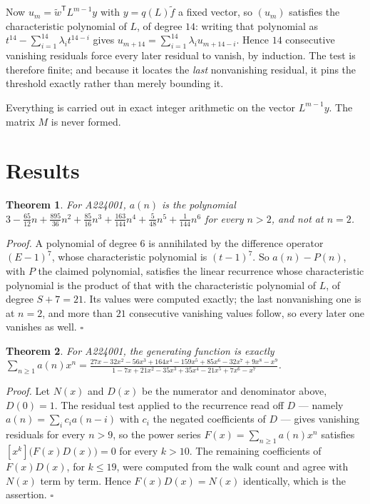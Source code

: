 \documentclass[11pt]{article}
\newtheorem{theorem}{Theorem}
\theoremstyle{definition}
\begin{document}
Now $u_m = \tilde w^{\mathsf T} L^{m-1} y$ with $y = q(L)\tilde f$ a fixed vector, so $(u_m)$ satisfies the characteristic polynomial of $L$, of degree $14$: writing that polynomial as $t^{14} - \sum_{i=1}^{14} \lambda_i t^{14-i}$ gives $u_{m+14} = \sum_{i=1}^{14} \lambda_i u_{m+14-i}$. Hence $14$ consecutive vanishing residuals force every later residual to vanish, by induction. The test is therefore finite; and because it locates the {\itshape last} nonvanishing residual, it pins the threshold exactly rather than merely bounding it.

Everything is carried out in exact integer arithmetic on the vector $L^{m-1}y$. The matrix $M$ is never formed.

\section{Results}

\begin{theorem} For A224001, $a(n)$ is the polynomial $3 - \frac{65}{12}n + \frac{895}{36}n^{2} + \frac{85}{16}n^{3} + \frac{163}{144}n^{4} + \frac{5}{48}n^{5} + \frac{1}{144}n^{6}$ for every $n > 2$, and not at $n = 2$.\end{theorem}

{\itshape Proof.} A polynomial of degree $6$ is annihilated by the difference operator $(E-1)^{7}$, whose characteristic polynomial is $(t-1)^{7}$. So $a(n) - P(n)$, with $P$ the claimed polynomial, satisfies the linear recurrence whose characteristic polynomial is the product of that with the characteristic polynomial of $L$, of degree $S + 7 = 21$. Its values were computed exactly; the last nonvanishing one is at $n = 2$, and more than $21$ consecutive vanishing values follow, so every later one vanishes as well. $\square$

\begin{theorem} For A224001, the generating function is exactly $\sum_{n\ge 1} a(n)x^n = \frac{27x - 32x^{2} - 56x^{3} + 164x^{4} - 159x^{5} + 85x^{6} - 32x^{7} + 9x^{8} - x^{9}}{1 - 7x + 21x^{2} - 35x^{3} + 35x^{4} - 21x^{5} + 7x^{6} - x^{7}}$.\end{theorem}

{\itshape Proof.} Let $N(x)$ and $D(x)$ be the numerator and denominator above, $D(0)=1$. The residual test applied to the recurrence read off $D$ --- namely $a(n) = \sum_i c_i a(n-i)$ with $c_i$ the negated coefficients of $D$ --- gives vanishing residuals for every $n > 9$, so the power series $F(x)=\sum_{n\ge 1}a(n)x^n$ satisfies $[x^k]\bigl(F(x)D(x)\bigr) = 0$ for every $k > 10$. The remaining coefficients of $F(x)D(x)$, for $k \le 19$, were computed from the walk count and agree with $N(x)$ term by term. Hence $F(x)D(x) = N(x)$ identically, which is the assertion. $\square$
\end{document}
